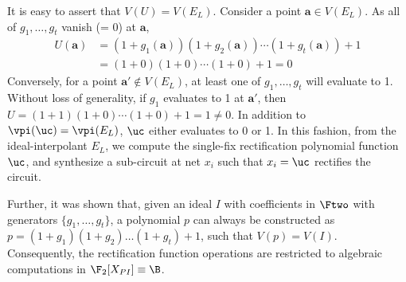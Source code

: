 It is easy to assert that $V(U) = V(E_L)$. 
Consider a point $\bm{a} \in V(E_L)$. As all of 
$g_1,\dots,g_t$ vanish (= 0) at $\bm{a}$,
\begin{align*}
U(\bm{a}) &= (1+g_1(\bm{a}))(1+g_2(\bm{a}))\cdots(1+g_t(\bm{a}))+1 \\
&= (1+0)(1+0)\cdots(1+0) + 1 = 0
\end{align*}
Conversely, for a point $\bm{a'} \not \in V(E_L)$, at least one  
of $g_1,\dots,g_t$ will evaluate to 1. 
Without loss of generality, if
$g_1$ evaluates to 1 at $\bm{a'}$, then $U=(1+1)(1+0)\cdots(1+0)+1 = 1 \neq
0$. In addition to $\vpi(\uc) = \vpi(E_L)$, $\uc$ either evaluates to 0 or 1. 
In this fashion, from the ideal-interpolant $E_L$, we compute the
single-fix rectification polynomial function $\uc$, and synthesize a
sub-circuit at net $x_i$ such that $x_i = \uc$ rectifies the circuit. 


Further, it was shown that, given an ideal $I$ with coefficients in $\Ftwo$ with generators  $\{g_1,\dots,g_t\}$, 
a polynomial $p$ can always be constructed as $p = (1+g_1)(1+g_2)\dots(1+g_t)+1$, such that $V(p) = V(I)$. 
Consequently, the rectification function operations are restricted to
algebraic computations in $\F_2[X_{PI}]\equiv \B$. 

